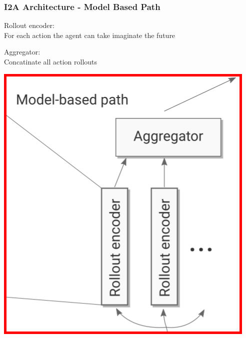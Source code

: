 \begin{frame}
    \frametitle{I2A Architecture - Model Based Path}

\begin{multicols}{2}
	\begin{PraesentationAufzaehlung}
	    \item Rollout encoder:\\
		For each action the agent can take 
		imaginate the future%
		\item Aggregator: \\
		Concatinate all action rollouts
	\end{PraesentationAufzaehlung}
    \vfill\columnbreak
	\begin{center}
    \includegraphics[height=.5\textheight]{./Images/i2a_model_based.png}%
	\end{center}
\end{multicols}
    
\end{frame}
\clearpage



